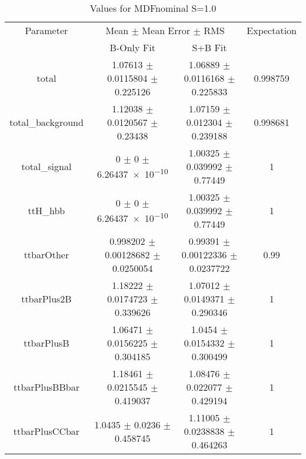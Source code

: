 \begin{table}
\centering
\caption{Values for MDFnominal S=1.0}
\begin{tabular}{cccc}
\toprule
Parameter & \multicolumn{2}{c}{Mean $\pm$ Mean Error $\pm$ RMS} & Expectation\\
 & B-Only Fit & S+B Fit & \\
\midrule
total & \num{1.07613} $\pm$ \num{0.0115804} $\pm$ \num{0.225126} & \num{1.06889} $\pm$ \num{0.0116168} $\pm$ \num{0.225833} & \num{0.998759}\\
total\_background & \num{1.12038} $\pm$ \num{0.0120567} $\pm$ \num{0.23438} & \num{1.07159} $\pm$ \num{0.012304} $\pm$ \num{0.239188} & \num{0.998681}\\
total\_signal & \num{0} $\pm$ \num{0} $\pm$ \num{6.26437e-10} & \num{1.00325} $\pm$ \num{0.039992} $\pm$ \num{0.77449} & \num{1}\\
ttH\_hbb & \num{0} $\pm$ \num{0} $\pm$ \num{6.26437e-10} & \num{1.00325} $\pm$ \num{0.039992} $\pm$ \num{0.77449} & \num{1}\\
ttbarOther & \num{0.998202} $\pm$ \num{0.00128682} $\pm$ \num{0.0250054} & \num{0.99391} $\pm$ \num{0.00122336} $\pm$ \num{0.0237722} & \num{0.99}\\
ttbarPlus2B & \num{1.18222} $\pm$ \num{0.0174723} $\pm$ \num{0.339626} & \num{1.07012} $\pm$ \num{0.0149371} $\pm$ \num{0.290346} & \num{1}\\
ttbarPlusB & \num{1.06471} $\pm$ \num{0.0156225} $\pm$ \num{0.304185} & \num{1.0454} $\pm$ \num{0.0154332} $\pm$ \num{0.300499} & \num{1}\\
ttbarPlusBBbar & \num{1.18461} $\pm$ \num{0.0215545} $\pm$ \num{0.419037} & \num{1.08476} $\pm$ \num{0.022077} $\pm$ \num{0.429194} & \num{1}\\
ttbarPlusCCbar & \num{1.0435} $\pm$ \num{0.0236} $\pm$ \num{0.458745} & \num{1.11005} $\pm$ \num{0.0238838} $\pm$ \num{0.464263} & \num{1}\\
\bottomrule
\end{tabular}
\end{table}